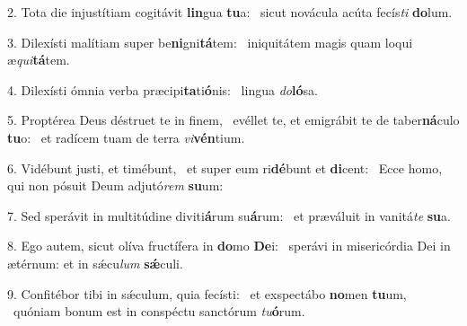2. Tota die injustítiam cogitávit \textbf{lin}gua \textbf{tu}a: \ast\  sicut novácula acúta fecís\textit{ti} \textbf{do}lum.\

3. Dilexísti malítiam super be\textbf{ni}gni\textbf{tá}tem: \ast\  iniquitátem magis quam loqui æ\textit{qui}\textbf{tá}tem.\

4. Dilexísti ómnia verba præcipi\textbf{ta}ti\textbf{ó}nis: \ast\  lingua \textit{do}\textbf{ló}sa.\

5. Proptérea Deus déstruet te in finem, \dag\  evéllet te, et emigrábit te de taber\textbf{ná}culo \textbf{tu}o: \ast\  et radícem tuam de terra \textit{vi}\textbf{vén}tium.\

6. Vidébunt justi, et timébunt, \dag\  et super eum ri\textbf{dé}bunt et \textbf{di}cent: \ast\  Ecce homo, qui non pósuit Deum adjutó\textit{rem} \textbf{su}um:\

7. Sed sperávit in multitúdine diviti\textbf{á}rum su\textbf{á}rum: \ast\  et præváluit in vanitá\textit{te} \textbf{su}a.\

8. Ego autem, sicut olíva fructífera in \textbf{do}mo \textbf{De}i: \ast\  sperávi in misericórdia Dei in ætérnum: et in sǽcu\textit{lum} \textbf{sǽ}culi.\

9. Confitébor tibi in sǽculum, quia fecísti: \dag\  et exspectábo \textbf{no}men \textbf{tu}um, \ast\  quóniam bonum est in conspéctu sanctórum \textit{tu}\textbf{ó}rum.\

